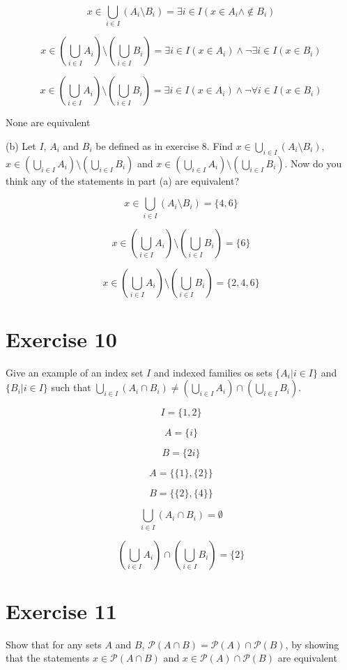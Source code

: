 \documentclass[11pt]{article}
\newcommand{\powerset}[1]{\mathscr{P}(#1)}
\begin{document}
$$x \in \bigcup_{i \in I} (A_i \setminus B_i) = 
\exists i \in I (x \in A_i \wedge \notin B_i)$$

$$x \in (\bigcup_{i \in I} A_i) \setminus (\bigcup_{i \in I} B_i) = 
\exists i \in I (x \in A_i) \wedge \neg \exists i \in I (x \in B_i)$$

$$x \in (\bigcup_{i \in I} A_i) \setminus (\bigcup_{i \in I} B_i) =
\exists i \in I (x \in A_i) \wedge \neg \forall i \in I (x \in B_i)$$

None are equivalent

\noindent (b) Let $I$, $A_i$ and $B_i$ be defined as in exercise 8. Find 
$x \in \bigcup_{i \in I} (A_i \setminus B_i)$, 
$x \in (\bigcup_{i \in I} A_i) \setminus (\bigcup_{i \in I} B_i)$ and 
$x \in (\bigcup_{i \in I} A_i) \setminus (\bigcup_{i \in I} B_i)$.
Now do you think any of the statements in part (a) are equivalent?

$$x \in \bigcup_{i \in I} (A_i \setminus B_i) = \{4, 6\}$$

$$x \in (\bigcup_{i \in I} A_i) \setminus (\bigcup_{i \in I} B_i) = \{6\}$$

$$x \in (\bigcup_{i \in I} A_i) \setminus (\bigcup_{i \in I} B_i) = \{2, 4, 6\}$$

\section*{Exercise 10}

Give an example of an index set $I$ and indexed families os sets 
$\{A_i | i \in I\}$ and $\{B_i | i \in I\}$ such that 
$\bigcup_{i \in I} (A_i \cap B_i) \neq 
(\bigcup_{i \in I} A_i) \cap (\bigcup_{i \in I} B_i)$.

$$I = \{1, 2\}$$

$$A = \{i\}$$

$$B = \{2i\}$$

$$A = \{\{1\}, \{2\}\}$$

$$B = \{\{2\}, \{4\}\}$$

$$\bigcup_{i \in I} (A_i \cap B_i) = \emptyset$$

$$(\bigcup_{i \in I} A_i) \cap (\bigcup_{i \in I} B_i) = \{2\}$$

\section*{Exercise 11}

Show that for any sets $A$ and $B$, 
$\powerset{A \cap B} = \powerset{A} \cap \powerset{B}$, by showing that the 
statements $x \in \powerset{A \cap B}$ and $x \in \powerset{A} \cap \powerset{B}$
are equivalent
\end{document}
